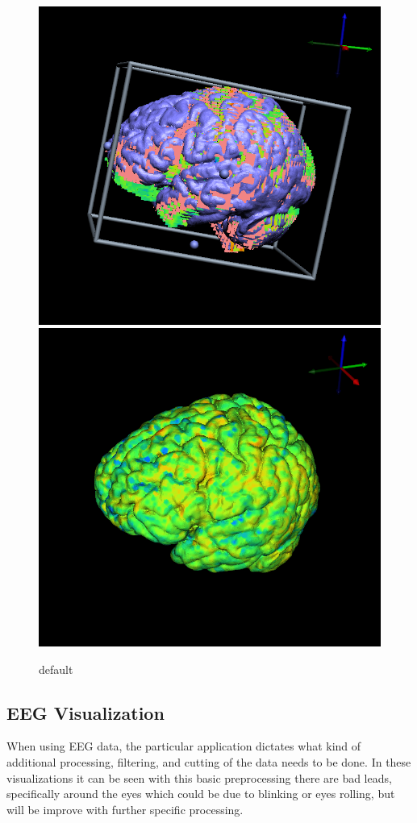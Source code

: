 \begin{figure}[H]
\begin{center}
\includegraphics[width=.49\textwidth]{Figures/fmri_reg}
\includegraphics[width=.49\textwidth]{Figures/fmri_1}
\caption{default}
\label{default}
\end{center}
\end{figure}

\subsection{EEG Visualization}

When using EEG data, the particular application dictates what kind of additional processing, filtering, and cutting of the data needs to be done. In these visualizations it can be seen with this basic preprocessing there are bad leads, specifically around the eyes which could be due to blinking or eyes rolling, but will be improve with further specific processing.

